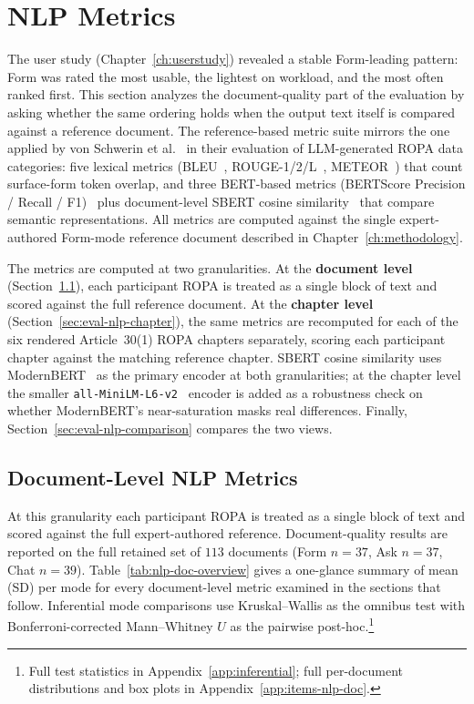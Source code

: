 \section{NLP Metrics}
\label{sec:eval-docquality}

The user study (Chapter~\ref{ch:userstudy}) revealed a stable
Form-leading pattern: Form was rated the most usable, the lightest
on workload, and the most often ranked first. This section analyzes
the document-quality part of the evaluation by asking whether the
same ordering holds when the output text itself is compared
against a reference document. The reference-based metric suite
mirrors the one applied by von Schwerin et
al.~\cite{schwerinSystematicComparisonOpen2024} in their
evaluation of LLM-generated ROPA data categories: five lexical
metrics (BLEU~\cite{Papineni2002}, ROUGE-1/2/L~\cite{Lin2004},
METEOR~\cite{Banerjee2005}) that count surface-form token overlap,
and three BERT-based metrics (BERTScore Precision / Recall /
F1)~\cite{Zhang2020} plus document-level SBERT cosine
similarity~\cite{Reimers2019} that compare semantic
representations. All metrics are computed against
the single expert-authored Form-mode reference document described
in Chapter~\ref{ch:methodology}.

The metrics are computed at two granularities. At the \textbf{document
level} (Section~\ref{sec:eval-nlp-doc}), each participant ROPA is
treated as a single block of text and scored against the full
reference document. At the \textbf{chapter level}
(Section~\ref{sec:eval-nlp-chapter}), the same metrics are
recomputed for each of the six rendered Article~30(1) ROPA
chapters separately, scoring each participant chapter against the
matching reference chapter. SBERT cosine similarity
uses ModernBERT~\cite{HFModernBERTBase} as the primary encoder at
both granularities; at the chapter level the smaller
\texttt{all-MiniLM-L6-v2}~\cite{HFMiniLML6v2} encoder is added as
a robustness check on whether ModernBERT's near-saturation masks
real differences.
Finally, Section~\ref{sec:eval-nlp-comparison} compares the two views.

\subsection{Document-Level NLP Metrics}
\label{sec:eval-nlp-doc}

At this granularity each participant ROPA is treated as a single
block of text and scored against the full expert-authored
reference. Document-quality results are reported on the full
retained set of $113$ documents (Form $n = 37$, Ask $n = 37$,
Chat $n = 39$). Table~\ref{tab:nlp-doc-overview} gives a one-glance summary of
mean (SD) per mode for every document-level metric examined in
the sections that follow. Inferential mode comparisons use Kruskal--Wallis as the
omnibus test with Bonferroni-corrected Mann--Whitney $U$ as the
pairwise post-hoc.\footnote{Full test statistics in
Appendix~\ref{app:inferential}; full per-document distributions
and box plots in Appendix~\ref{app:items-nlp-doc}.}

